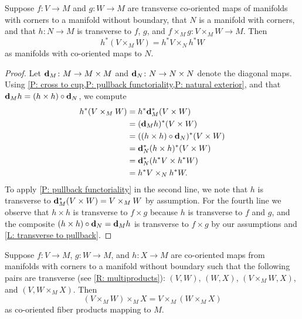 \begin{corollary}\label{C: fiber natural pullback}
	Suppose $f \colon V \to M$ and $g \colon W \to M$ are transverse co-oriented maps of manifolds with corners to a manifold without boundary, that $N$ is a manifold with corners, and that $h \colon N \to M$ is transverse to $f$, $g$, and $f \times_M g \colon V \times_M W \to M$.
	Then
	$$h^*(V \times_M W) = h^*V \times_N h^*W$$
	as manifolds with co-oriented maps to $N$.
\end{corollary}

\begin{proof}
	Let $\mathbf{d}_M \colon M \to M \times M$ and $\mathbf{d}_N \colon N \to N \times N$ denote the diagonal maps.
	Using \cref{P: cross to cup,P: pullback functoriality,P: natural exterior}, and that $\mathbf{d}_M h = (h \times h) \circ \mathbf{d}_N$,
	we compute
	\begin{align*}
		h^*(V \times_M W)& = h^*\mathbf{d}_M^*(V \times W)\\
		& = (\mathbf{d}_M h)^*(V \times W)\\
		& = ((h \times h) \circ \mathbf{d}_N)^*(V \times W)\\
		& = \mathbf{d}_N^*(h \times h)^*(V \times W)\\
		& = \mathbf{d}_N^*(h^*V \times h^*W)\\
		& = h^*V \times_N h^*W.
	\end{align*}
	To apply \cref{P: pullback functoriality} in the second line, we note that $h$ is transverse to $\mathbf{d}_M^*(V \times W) = V \times_M W$ by assumption.
	For the fourth line we observe that $h \times h$ is transverse to $f \times g$ because $h$ is transverse to $f$ and $g$, and the composite $(h \times h) \circ \mathbf{d}_N = \mathbf{d}_M h$ is transverse to $f \times g$ by our assumptions and \cref{L: transverse to pullback}.
\end{proof}

\begin{corollary}\label{C: fiber assoc}
	Suppose $f \colon V \to M$, $g \colon W \to M$, and $h \colon X \to M$ are co-oriented maps from manifolds with corners to a manifold without boundary such that the following pairs are transverse (see \cref{R: multiproducts}): $(V,W)$, $(W,X)$, $(V \times_M W,X)$, and $(V,W \times_M X)$.
	Then $$(V \times_M W) \times_M X = V \times_M (W \times_M X)$$ as co-oriented fiber products mapping to $M$.
\end{corollary}

